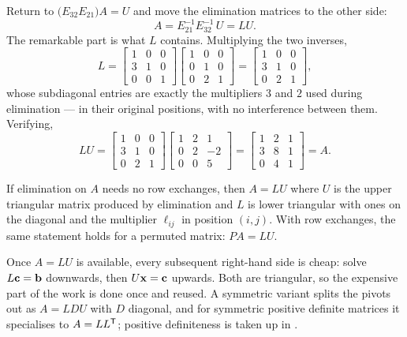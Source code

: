 Return to \(\bigl(E_{32}E_{21}\bigr)A=U\) and move the elimination matrices to
the other side:
\[
	A=E_{21}^{-1}E_{32}^{-1}\,U=LU .
\]
The remarkable part is what \(L\) contains. Multiplying the two inverses,
\[
	L=\begin{bmatrix}1&0&0\\3&1&0\\0&0&1\end{bmatrix}
	  \begin{bmatrix}1&0&0\\0&1&0\\0&2&1\end{bmatrix}
	 =\begin{bmatrix}1&0&0\\3&1&0\\0&2&1\end{bmatrix},
\]
whose subdiagonal entries are exactly the multipliers \(3\) and \(2\) used
during elimination --- in their original positions, with no interference between
them. Verifying,
\[
	LU=\begin{bmatrix}1&0&0\\3&1&0\\0&2&1\end{bmatrix}
	   \begin{bmatrix}1&2&1\\0&2&-2\\0&0&5\end{bmatrix}
	 =\begin{bmatrix}1&2&1\\3&8&1\\0&4&1\end{bmatrix}=A .
\]

\begin{theorem}
If elimination on \(A\) needs no row exchanges, then \(A=LU\) where \(U\) is the
upper triangular matrix produced by elimination and \(L\) is lower triangular
with ones on the diagonal and the multiplier \(\ell_{ij}\) in position
\((i,j)\). With row exchanges, the same statement holds for a permuted matrix:
\(PA=LU\).
\end{theorem}


Once \(A=LU\) is available, every subsequent right-hand side is cheap: solve
\(L\mathbf{c}=\mathbf{b}\) downwards, then \(U\mathbf{x}=\mathbf{c}\) upwards. Both are
triangular, so the expensive part of the work is done once and reused. A
symmetric variant splits the pivots out as \(A=LDU\) with \(D\) diagonal, and for
symmetric positive definite matrices it specialises to \(A=LL^{\mathsf{T}}\); positive
definiteness is taken up in .


